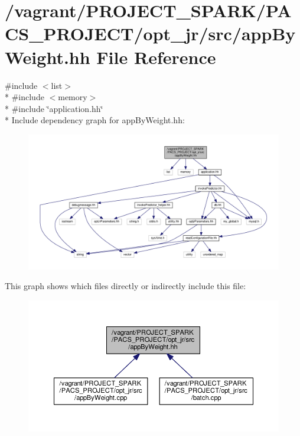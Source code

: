 \hypertarget{appByWeight_8hh}{\section{/vagrant/\-P\-R\-O\-J\-E\-C\-T\-\_\-\-S\-P\-A\-R\-K/\-P\-A\-C\-S\-\_\-\-P\-R\-O\-J\-E\-C\-T/opt\-\_\-jr/src/app\-By\-Weight.hh File Reference}
\label{appByWeight_8hh}
}
{\ttfamily \#include $<$list$>$}\\*
{\ttfamily \#include $<$memory$>$}\\*
{\ttfamily \#include \char`\"{}application.\-hh\char`\"{}}\\*
Include dependency graph for app\-By\-Weight.\-hh\-:
\nopagebreak
\begin{figure}[H]
\begin{center}
\leavevmode
\includegraphics[width=350pt]{appByWeight_8hh__incl}
\end{center}
\end{figure}
This graph shows which files directly or indirectly include this file\-:\nopagebreak
\begin{figure}[H]
\begin{center}
\leavevmode
\includegraphics[width=350pt]{appByWeight_8hh__dep__incl}
\end{center}
\end{figure}
